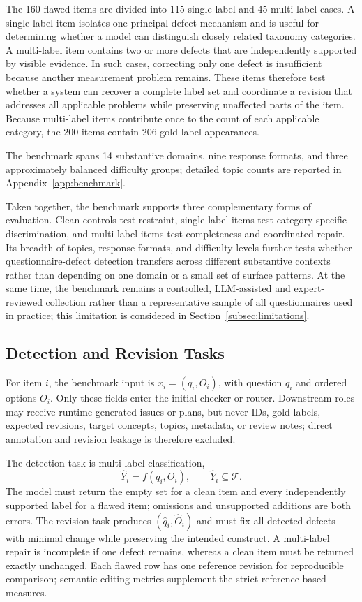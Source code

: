 \documentclass[11pt,a4paper]{article}
\begin{document}
The 160 flawed items are divided into 115 single-label and 45 multi-label
cases. A single-label item isolates one principal defect mechanism and is useful
for determining whether a model can distinguish closely related taxonomy
categories. A multi-label item contains two or more defects that are
independently supported by visible evidence. In such cases, correcting only one
defect is insufficient because another measurement problem remains. These items
therefore test whether a system can recover a complete label set and coordinate
a revision that addresses all applicable problems while preserving unaffected
parts of the item. Because multi-label items contribute once to the count of
each applicable category, the 200 items contain 206 gold-label appearances.

The benchmark spans 14 substantive domains, nine response formats, and three
approximately balanced difficulty groups; detailed topic counts are reported in
Appendix~\ref{app:benchmark}.


Taken together, the benchmark supports three complementary forms of
evaluation. Clean controls test restraint, single-label items test
category-specific discrimination, and multi-label items test completeness and
coordinated repair. Its breadth of topics, response formats, and difficulty
levels further tests whether questionnaire-defect detection transfers across
different substantive contexts rather than depending on one domain or a small
set of surface patterns. At the same time, the benchmark remains a controlled,
LLM-assisted and expert-reviewed collection rather than a representative sample
of all questionnaires used in practice; this limitation is considered in
Section~\ref{subsec:limitations}.



\subsection{Detection and Revision Tasks}
\label{subsec:task-definition}

For item $i$, the benchmark input is $x_i=(q_i,O_i)$, with question $q_i$
and ordered options $O_i$. Only these fields enter the initial checker or router.
Downstream roles may receive runtime-generated issues or plans, but never IDs,
gold labels, expected revisions, target concepts, topics, metadata, or review
notes; direct annotation and revision leakage is therefore excluded.

The detection task is multi-label classification,
\[
    \widehat{Y}_i=f(q_i,O_i), \qquad \widehat{Y}_i\subseteq\mathcal{T}.
\]
The model must return the empty set for a clean item and every independently
supported label for a flawed item; omissions and unsupported additions are both
errors. The revision task produces $(\widehat{q}_i,\widehat{O}_i)$ and must fix
all detected defects with minimal change while preserving the intended construct.
A multi-label repair is incomplete if one defect remains, whereas a clean item
must be returned exactly unchanged. Each flawed row has one reference revision for reproducible comparison;
semantic editing metrics supplement the strict reference-based measures.
\end{document}
